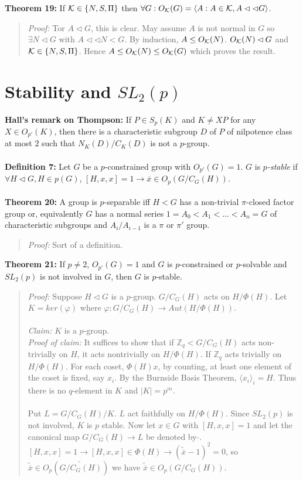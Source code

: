 {\bf Theorem 19:} If ${\cal K} \in  \{N, S, \Pi\}$ then 
$\forall G: O_{\cal K}(G)= \langle A: A \in {\cal K}, A \lhd \lhd G \rangle $.
\begin{quote}
\emph{Proof:}  
Tor $A \lhd G$, this is clear.  May assume $A$ is not normal in $G$ so $\exists N \lhd G$ with
$A \lhd \lhd N<G$.  By induction, 
$A \leq O_{\cal K}(N)$.  
$O_{\cal K}(N) \lhd G$ and  ${\cal K} \in \{N , S , \Pi \}$.  Hence $A \leq O_{\cal K}(N) \leq O_{\cal K}(G)$ which
proves the result.
\end{quote}
\section{Stability and $SL_2(p)$}
{\bf Hall's remark on Thompson:}  If $P \in S_p(K)$ and $K \ne XP$ for any $X \in O_{p'}(K)$, then
there is a characteristic subgroup $D$ of $P$ of nilpotence class at most $2$ such that
$N_K(D)/C_K(D)$ is not a $p$-group.
\\
\\
{\bf Definition 7:}  Let $G$ be a $p$-constrained group with $O_{p'}(G)=1$.
$G$ is $p$\emph{-stable} if $\forall H \lhd G, H \in p(G)$,
$[H,x,x]=1 \rightarrow {\overline x} \in O_p(G/C_G(H))$.
\\
\\
{\bf Theorem 20:}
A group is $p$-separable iff
$H<G$ has a non-trivial $\pi$-closed factor group or, equivalently
$G$ has a normal series $1= A_0 < A_1 < \ldots <A_n=G$ of characteristic
subgroups and $A_i/A_{i-1}$ is a $\pi$ or $\pi'$ group.
\begin{quote}
\emph{Proof:}  Sort of a definition.
\end{quote}
{\bf Theorem 21:}
If $p \ne 2$, $O_{p'}(G)=1$ and $G$ is $p$-constrained or $p$-solvable and $SL_2(p)$ is
not involved in $G$, then $G$ is $p$-stable.
\begin{quote}
\emph{Proof:}
Suppose $H \lhd G$ is a $p$-group.  $G/C_G(H)$ acts on $H/\Phi(H)$.  Let $K=ker(\varphi)$
where $\varphi: G/C_G(H) \rightarrow Aut(H/\Phi(H))$.
\\
\\
\emph{Claim:} $K$ is a $p$-group.
\\
\emph{Proof of claim:} It suffices to show that if
${\mathbb Z}_q < G/C_G(H)$ acts non-trivially on $H$, it acts nontrivially on
$H/\Phi(H)$.  If ${\mathbb Z}_q$ acts trivially on $H/\Phi(H)$.  For each coset,
$\Phi(H)x$, by counting, at least one element of the coset is fixed, say $x_i$.
By the Burnside Basis Theorem, $ \langle x_i \rangle_i = H$.  
Thus there is no $q$-element in $K$ and
$|K|=p^m$.
\\
\\
Put $L= G/C_G(H)/K$.  $L$ act faithfully on $H/\Phi(H)$.  Since $SL_2(p)$ is not involved,
$K$ is $p$ stable.  Now let $x \in G$ with $[H,x,x]=1$ and let the canonical map
$G/C_G(H) \rightarrow L$ be denoted by $\tilde {}$.  
$[H,x,x]=1 \rightarrow [H,x,x] \in \Phi(H) \rightarrow
(\tilde {\overline x}-1)^2=0$, so
$\tilde {\overline x} \in O_p(\tilde{G/C_G(H)})$ we have
$\tilde {\overline x} \in O_p(G/C_G(H))$.
\end{quote}
